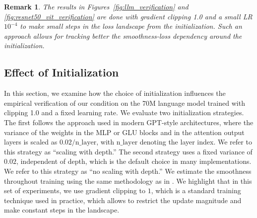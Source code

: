 \documentclass[a4paper,11pt]{article}
\newcommand{\1}{\mathbbm{1}}
\theoremstyle{plain}
\newtheorem{remark}{Remark}[section]
\begin{document}
\begin{remark}
    The results in Figures~\ref{fig:llm_verification} and \ref{fig:resnet50_vit_verification} are done with gradient clipping 1.0 and a small LR $10^{-4}$ to make small steps in the loss landscape from the initialization. Such an approach allows for tracking better the smoothness-loss dependency around the initialization. 
\end{remark}



\subsection{Effect of Initialization}\label{sec:initialization}
In this section, we examine how the choice of initialization influences the empirical verification of our condition on the 70M language model trained with clipping 1.0 and a fixed learning rate. We evaluate two initialization strategies. The first follows the approach used in modern GPT-style architectures, where the variance of the weights in the MLP or GLU blocks and in the attention output layers is scaled as $0.02/\textrm{n_layer}$, with 
$\textrm{n_layer}$ denoting the layer index. We refer to this strategy as ``scaling with depth.'' The second strategy uses a fixed variance of $0.02$, independent of depth, which is the default choice in many implementations. We refer to this strategy as ``no scaling with depth.'' We estimate the smoothness throughout training using the same methodology as in . We highlight that in this set of experiments, we use gradient clipping to $1$, which is a standard training technique used in practice, which allows to restrict the update magnitude and make constant steps in the landscape.
\end{document}
